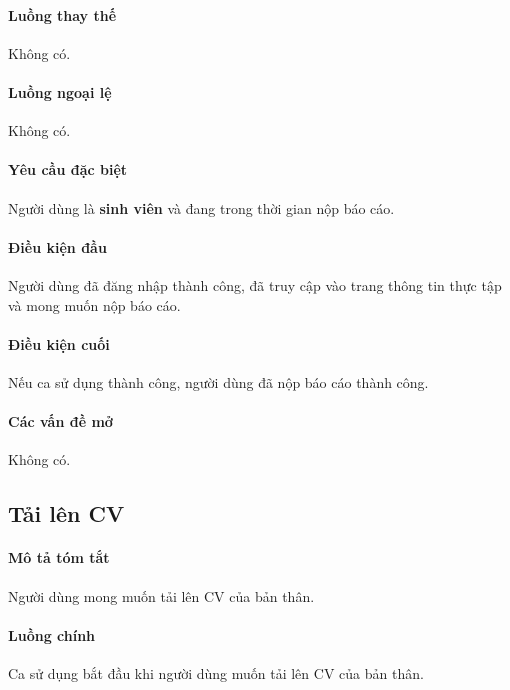 \documentclass[./../main.tex]{subfiles}
\begin{document}
\paragraph*{Luồng thay thế} Không có.

\paragraph*{Luồng ngoại lệ} Không có.

\paragraph*{Yêu cầu đặc biệt}

Người dùng là \textbf{sinh viên} và đang trong thời gian nộp báo cáo.

\paragraph*{Điều kiện đầu}

Người dùng đã đăng nhập thành công, đã truy cập vào trang thông tin thực tập và mong muốn nộp báo cáo.

\paragraph*{Điều kiện cuối}

Nếu ca sử dụng thành công, người dùng đã nộp báo cáo thành công.

\paragraph*{Các vấn đề mở}

Không có.

\subsection{Tải lên CV}

\paragraph*{Mô tả tóm tắt}

Người dùng mong muốn tải lên CV của bản thân.

\paragraph*{Luồng chính} Ca sử dụng bắt đầu khi người dùng muốn tải lên CV của bản thân.
\end{document}
